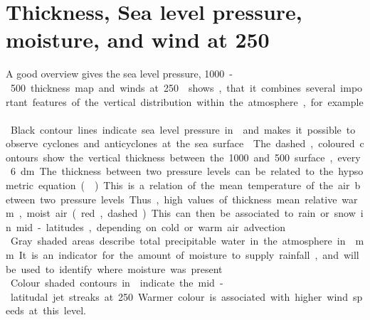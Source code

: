 \section{Thickness, Sea level pressure, moisture, and wind at \SI{250}{\hPa}}
\label{sec:Geop}
A good overview gives the sea level pressure, \SI{1000}-\SI{500}{\hPa} thickness map and winds at \SI{250}{\hPa}.  shows, that it combines several important features of the vertical distribution within the atmosphere, for example.\\
Black contour lines indicate sea level pressure in \SI{}{\hPa} and makes it possible to observe cyclones and anticyclones at the sea surface. 

\noindent The dashed, coloured contours show the vertical thickness between the \SI{1000}{\hPa} and \SI{500}{\hPa} surface, every \SI{6}{\deca\meter}. The thickness between two pressure levels can be related to the hypsometric equation (). This is a relation of the mean temperature of the air between two pressure levels. Thus, high values of thickness mean relative warm, moist air (red, dashed). This can then be associated to rain or snow in mid-latitudes, depending on cold or warm air advection.
\\
Gray shaded areas describe total precipitable water in the atmosphere in \SI{}{\mm}. It is an indicator for the amount of moisture to supply rainfall, and will be used to identify where moisture was present.
\\
Colour shaded contours in  indicate the mid-latitudal jet streaks at \SI{250}{\hPa}. Warmer colour is associated with higher wind speeds at this level.  
%
